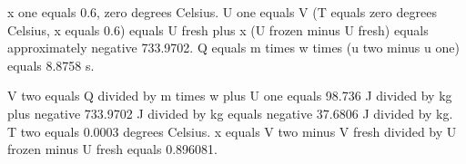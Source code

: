 x one equals 0.6, zero degrees Celsius.  
U one equals V (T equals zero degrees Celsius, x equals 0.6) equals U fresh plus x (U frozen minus U fresh) equals approximately negative 733.9702.  
Q equals m times w times (u two minus u one) equals 8.8758 s.  

V two equals Q divided by m times w plus U one equals 98.736 J divided by kg plus negative 733.9702 J divided by kg equals negative 37.6806 J divided by kg.  
T two equals 0.0003 degrees Celsius.  
x equals V two minus V fresh divided by U frozen minus U fresh equals 0.896081.